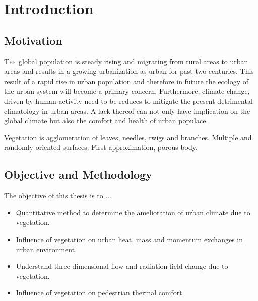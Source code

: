 \chapter{Introduction}
\label{ch:introduction}

\def\figdir{chapters/introduction/figures/}


%		

\section{Motivation}

\lettrine[lines=3,nindent=0em,loversize=0.1]{T}{he} global population is steady rising and migrating from rural areas to urban areas and results in a growing urbanization as urban for past two centuries. This result of a rapid rise in urban population and therefore in future the ecology of the urban system will become a primary concern. Furthermore, climate change, driven by human activity need to be reduces to mitigate the present detrimental climatology in urban areas. A lack thereof can not only have implication on the global climate but also the comfort and health of urban populace. 

Vegetation is agglomeration of leaves, needles, twigs and branches. Multiple and randomly oriented surfaces. First approximation, porous body. 



\section{Objective and Methodology}

The objective of this thesis is to ...  

\begin{itemize}
	\item Quantitative method to determine the amelioration of urban climate due to vegetation.
	\item Influence of vegetation on urban heat, mass and momentum exchanges in urban environment.
	\item Understand three-dimensional flow and radiation field change due to vegetation.
	\item Influence of vegetation on pedestrian thermal comfort. 
\end{itemize}



